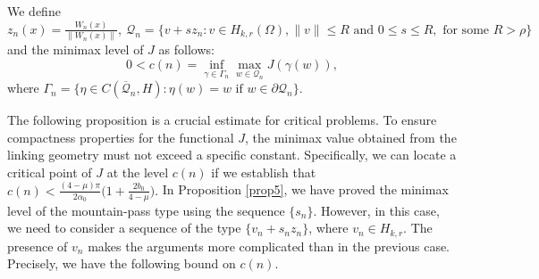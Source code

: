 \documentclass[11pt]{amsart}
\numberwithin{equation}{section}
\newcommand{\1}{\frac{1}{2}}
\begin{document}
	We define $z_n(x)=\frac{W_n(x)}{\|W_n(x)\|},\ \mathcal Q_n = \{ v+sz_n: v\in H_{k,r}(\Omega), \|v\|\leq R \text{ and } 0 \leq s \leq R, \text{ for some } R> \rho \}$ and the minimax level of $J$ as follows:
	\begin{equation}
		\label{5.4}
		0<c(n) =\inf_{\gamma \in \Gamma_n} \max_{w\in \mathcal Q_n} J(\gamma(w)),
	\end{equation}
	where $\Gamma_n = \{ \eta \in C(\overline{\mathcal Q}_n, H): \eta(w)=w \text{ if } w \in \partial \mathcal Q_n\}$.
	
	The following proposition is a crucial estimate for critical problems. To ensure compactness properties for the functional 
	$J$, the minimax value obtained from the linking geometry must not exceed a specific constant. Specifically, we can locate a critical point of $J$ at the level $c(n)$ if we establish that 
	$c(n)< \frac{(4-\mu)\pi}{2\alpha_0}\Big(1+\frac{2b_0}{4-\mu}\Big).$
	In Proposition \ref{prop5}, we have proved the minimax level of the mountain-pass type using the sequence $\{s_n\}$. However, in this case, we need to consider a sequence of the type $\{v_n+s_n z_n\}$, where $v_n \in H_{k,r}$. The presence of $v_n$ makes the arguments more complicated than in the previous case. Precisely, we have the following bound on $c(n)$.
	
\end{document}

